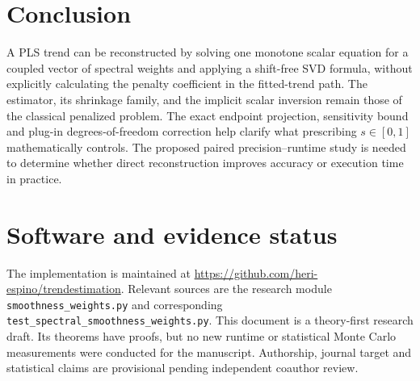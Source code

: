 \section{Conclusion}
A PLS trend can be reconstructed by solving
one monotone scalar equation for a coupled vector
of spectral weights and applying a shift-free SVD
formula, without explicitly calculating the
penalty coefficient in the fitted-trend path.
The estimator, its shrinkage family, and the
implicit scalar inversion remain those of the
classical penalized problem. The exact
endpoint projection, sensitivity bound and
plug-in degrees-of-freedom correction help
clarify what prescribing $s\in[0,1]$
mathematically controls. The proposed paired precision--runtime study is needed
to determine whether direct reconstruction improves
accuracy or execution time in practice.

\section*{Software and evidence status}
The implementation is maintained at
\url{https://github.com/heri-espino/trendestimation}.
Relevant sources are the research module
\texttt{smoothness\_weights.py} and corresponding
\texttt{test\_spectral\_smoothness\_weights.py}.
This document is a theory-first research
draft. Its theorems have proofs, but no new
runtime or statistical Monte Carlo measurements
were conducted for the manuscript.
Authorship, journal target and statistical
claims are provisional pending independent
coauthor review.
